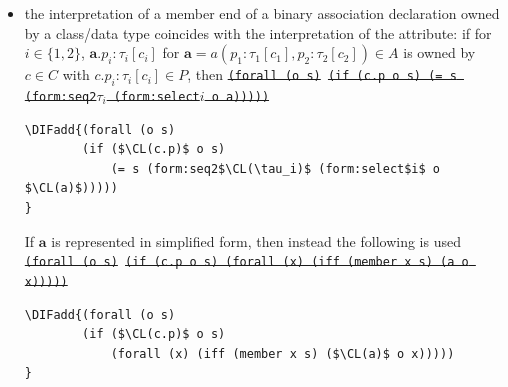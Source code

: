 \documentclass[10pt,fleqn,final]{scrreprt}
\newcommand*{\CL}{\ensuremath{\mathsf{CL}}\xspace}
\newenvironment{definitions}[0]{\medskip }{}
\newcommand{\white}[1]{{\color{white}{#1}}}
\newcommand{\qqquad}{\white{x}\qquad}
\providecommand{\DIFadd}[1]{{\protect\color{blue}\uwave{#1}}} %
\providecommand{\DIFdel}[1]{{\protect\color{red}\sout{#1}}}                      %
\providecommand{\DIFaddbegin}{} %
\providecommand{\DIFaddend}{} %
\providecommand{\DIFdelbegin}{} %
\providecommand{\DIFdelend}{} %
\begin{document}
\begin{definitions}
\begin{itemize}[topsep=0pt, label=--, leftmargin=*]
In case that all the $\tau_i$ are omitted (or, equivalently, equal to 
$\mathsf{Set}$), the representation is simplified to an \DIFdelbegin \DIFdel{$n$}\DIFdelend \DIFaddbegin \DIFadd{$r$}\DIFaddend -ary predicate:
\DIFdelbegin %
\texttt{\DIFdel{(forall ($x_1$ $x_2$ $\cdots$  $x_n$) (if (a $x_1$ $x_2$ $\cdots$  $x_n$) (and ($c_1$ $x_1$) $\cdots$ ($c_n$ $x_n$))))}}
\DIFdelend %
\DIFaddbegin \begin{lstlisting}[language=clif, mathescape]
\DIFadd{(forall (x$_1$ x$_2$ $\cdots$ x$_r$)
        (if ($\CL(a)$ x$_1$ x$_2$ $\cdots$ x$_r$) (and ($\CL(c_1)$ x$_1$) $\cdots$ ($\CL(c_r)$ $x_r$))))
}\end{lstlisting}
  \DIFaddend \item the interpretation of a member end of a binary association
declaration owned by a class/data type coincides with the interpretation
of the attribute: if for $i\in\{1,2\}$,
$\mathbf{a}.p_i : \tau_i[c_i]$
for $\mathbf{a} = a(p_1 : \tau_1[c_1], p_2 : \tau_2[c_2]) \in A$
is owned by $c \in C$ with $c.p_i : \tau_i[c_i] \in P$, then
\DIFdelbegin %
\texttt{\DIFdel{(forall (o s)}%
\DIFdel{(if (c.p o s) (= s (form:seq2$\tau_i$ (form:select$i$ o a)))))}}%
\DIFdelend %
\DIFaddbegin \begin{lstlisting}[language=clif, mathescape]
\DIFadd{(forall (o s)
        (if ($\CL(c.p)$ o s)
            (= s (form:seq2$\CL(\tau_i)$ (form:select$i$ o $\CL(a)$)))))
}\end{lstlisting}
\DIFaddend If $\mathbf{a}$ is represented in simplified form, then instead the
following is used
\DIFdelbegin %
\texttt{\DIFdel{(forall (o s)}%
\DIFdel{(if (c.p o s) (forall (x) (iff (member x s) (a o x)))))}}
\DIFdelend %
\DIFaddbegin \begin{lstlisting}[language=clif, mathescape]
\DIFadd{(forall (o s)
        (if ($\CL(c.p)$ o s)
            (forall (x) (iff (member x s) ($\CL(a)$ o x)))))
}\end{lstlisting}


\end{itemize}
\end{definitions}
\end{document}
